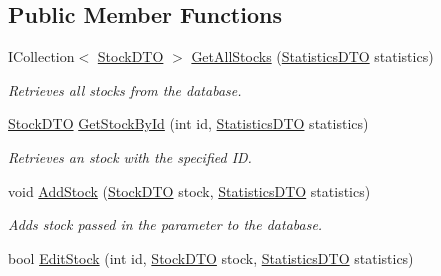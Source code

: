\subsection*{Public Member Functions}
\begin{DoxyCompactItemize}
\item 
I\+Collection$<$ \mbox{\hyperlink{class_gielda_l2_1_1_i_n_f_r_a_s_t_r_u_c_t_u_r_e_1_1_d_t_o_1_1_stock_d_t_o}{Stock\+D\+TO}} $>$ \mbox{\hyperlink{interface_gielda_l2_1_1_i_n_f_r_a_s_t_r_u_c_t_u_r_e_1_1_interfaces_1_1_i_stock_service_ae94c4404091898a36f0d5eafa5b0b7d9}{Get\+All\+Stocks}} (\mbox{\hyperlink{class_gielda_l2_1_1_i_n_f_r_a_s_t_r_u_c_t_u_r_e_1_1_d_t_o_1_1_statistics_d_t_o}{Statistics\+D\+TO}} statistics)
\begin{DoxyCompactList}\small\item\em Retrieves all stocks from the database. \end{DoxyCompactList}\item 
\mbox{\hyperlink{class_gielda_l2_1_1_i_n_f_r_a_s_t_r_u_c_t_u_r_e_1_1_d_t_o_1_1_stock_d_t_o}{Stock\+D\+TO}} \mbox{\hyperlink{interface_gielda_l2_1_1_i_n_f_r_a_s_t_r_u_c_t_u_r_e_1_1_interfaces_1_1_i_stock_service_ae04641f95a30ef6f62d499ef921646f7}{Get\+Stock\+By\+Id}} (int id, \mbox{\hyperlink{class_gielda_l2_1_1_i_n_f_r_a_s_t_r_u_c_t_u_r_e_1_1_d_t_o_1_1_statistics_d_t_o}{Statistics\+D\+TO}} statistics)
\begin{DoxyCompactList}\small\item\em Retrieves an stock with the specified ID. \end{DoxyCompactList}\item 
void \mbox{\hyperlink{interface_gielda_l2_1_1_i_n_f_r_a_s_t_r_u_c_t_u_r_e_1_1_interfaces_1_1_i_stock_service_a6f46f5fa67e7cc83b8b7cbb3a68345ea}{Add\+Stock}} (\mbox{\hyperlink{class_gielda_l2_1_1_i_n_f_r_a_s_t_r_u_c_t_u_r_e_1_1_d_t_o_1_1_stock_d_t_o}{Stock\+D\+TO}} stock, \mbox{\hyperlink{class_gielda_l2_1_1_i_n_f_r_a_s_t_r_u_c_t_u_r_e_1_1_d_t_o_1_1_statistics_d_t_o}{Statistics\+D\+TO}} statistics)
\begin{DoxyCompactList}\small\item\em Adds stock passed in the parameter to the database. \end{DoxyCompactList}\item 
bool \mbox{\hyperlink{interface_gielda_l2_1_1_i_n_f_r_a_s_t_r_u_c_t_u_r_e_1_1_interfaces_1_1_i_stock_service_a212f9f1d1da1a59c0e0307ebffdc28ff}{Edit\+Stock}} (int id, \mbox{\hyperlink{class_gielda_l2_1_1_i_n_f_r_a_s_t_r_u_c_t_u_r_e_1_1_d_t_o_1_1_stock_d_t_o}{Stock\+D\+TO}} stock, \mbox{\hyperlink{class_gielda_l2_1_1_i_n_f_r_a_s_t_r_u_c_t_u_r_e_1_1_d_t_o_1_1_statistics_d_t_o}{Statistics\+D\+TO}} statistics)

\end{DoxyCompactItemize}
